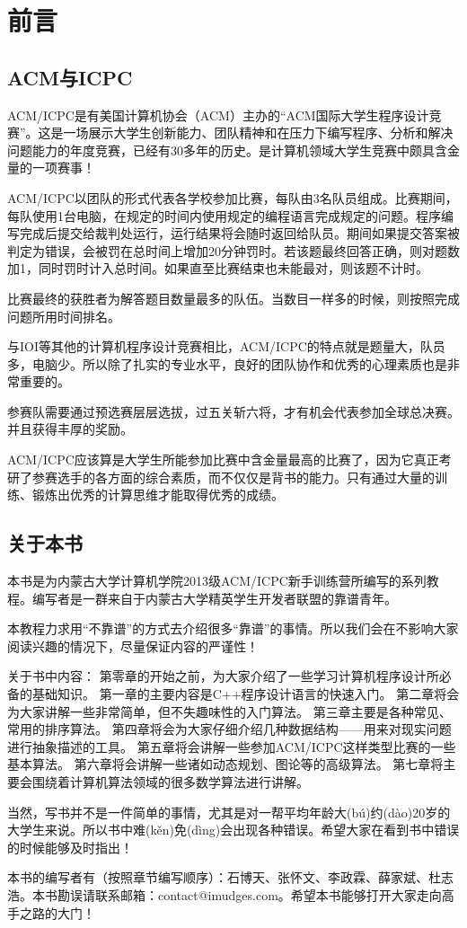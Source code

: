 \chapter*{前言}

\section*{ACM与ICPC}

ACM/ICPC是有美国计算机协会（ACM）主办的“ACM国际大学生程序设计竞赛”。这是一场展示大学生创新能力、团队精神和在压力下编写程序、分析和解决问题能力的年度竞赛，已经有30多年的历史。是计算机领域大学生竞赛中颇具含金量的一项赛事！

ACM/ICPC以团队的形式代表各学校参加比赛，每队由3名队员组成。比赛期间，每队使用1台电脑，在规定的时间内使用规定的编程语言完成规定的问题。程序编写完成后提交给裁判处运行，运行结果将会随时返回给队员。期间如果提交答案被判定为错误，会被罚在总时间上增加20分钟罚时。若该题最终回答正确，则对题数加1，同时罚时计入总时间。如果直至比赛结束也未能最对，则该题不计时。

比赛最终的获胜者为解答题目数量最多的队伍。当数目一样多的时候，则按照完成问题所用时间排名。

与IOI等其他的计算机程序设计竞赛相比，ACM/ICPC的特点就是题量大，队员多，电脑少。所以除了扎实的专业水平，良好的团队协作和优秀的心理素质也是非常重要的。

参赛队需要通过预选赛层层选拔，过五关斩六将，才有机会代表参加全球总决赛。并且获得丰厚的奖励。

ACM/ICPC应该算是大学生所能参加比赛中含金量最高的比赛了，因为它真正考研了参赛选手的各方面的综合素质，而不仅仅是背书的能力。只有通过大量的训练、锻炼出优秀的计算思维才能取得优秀的成绩。

\section*{关于本书}

本书是为内蒙古大学计算机学院2013级ACM/ICPC新手训练营所编写的系列教程。编写者是一群来自于内蒙古大学精英学生开发者联盟的靠谱青年。

本教程力求用“不靠谱”的方式去介绍很多“靠谱”的事情。所以我们会在不影响大家阅读兴趣的情况下，尽量保证内容的严谨性！

关于书中内容：
第零章的开始之前，为大家介绍了一些学习计算机程序设计所必备的基础知识。
第一章的主要内容是C++程序设计语言的快速入门。
第二章将会为大家讲解一些非常简单，但不失趣味性的入门算法。
第三章主要是各种常见、常用的排序算法。
第四章将会为大家仔细介绍几种数据结构——用来对现实问题进行抽象描述的工具。
第五章将会讲解一些参加ACM/ICPC这样类型比赛的一些基本算法。
第六章将会讲解一些诸如动态规划、图论等的高级算法。
第七章将主要会围绕着计算机算法领域的很多数学算法进行讲解。

当然，写书并不是一件简单的事情，尤其是对一帮平均年龄大(bú)约(dào)20岁的大学生来说。所以书中难(kěn)免(dìng)会出现各种错误。希望大家在看到书中错误的时候能够及时指出！

本书的编写者有（按照章节编写顺序）：石博天、张怀文、李政霖、薛家斌、杜志浩。本书勘误请联系邮箱：contact@imudges.com。希望本书能够打开大家走向高手之路的大门！ 
